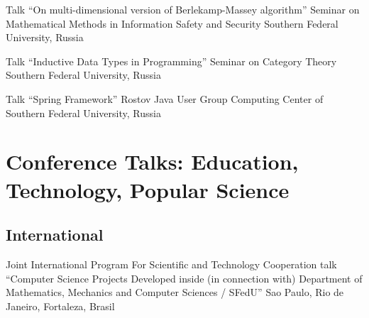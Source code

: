 \documentclass[11pt,a4paper]{moderncv}   %
\newcommand{\MyHrefImpl}[2]{%
\textcolor{blue}{\href{#1}{#2}}}
\def\LINKS{}
\newcommand*{\myhref}[2]{%
\ignorespaces%
\ifdefined\LINKS%
\MyHrefImpl{#1}{#2}%
\else%
#2%
\fi%
}
\begin{document}
{%
    {Talk “On multi-dimensional version of Berlekamp-Massey algorithm”}%
    {Seminar on Mathematical Methods in Information Safety and Security}%
    {Southern Federal University, Russia}%
    {}%
    {%
    }

%
    {Talk “Inductive Data Types in Programming”}%
    {Seminar on Category Theory}%
    {Southern Federal University, Russia}%
    {}%
    {%
    }


%
    {Talk “Spring Framework”}%
    {Rostov Java User Group}%
    {Computing Center of Southern Federal University, Russia}%
    {}%
    {%
    }
}

\section{Conference Talks: Education, Technology, Popular Science}

\subsection{International}

%
    {Joint International Program For Scientific and Technology Cooperation}%
    {talk “Computer Science Projects Developed inside (in connection with) Department of Mathematics, Mechanics and Computer Sciences / SFedU”}
    {Sao Paulo, Rio de Janeiro, Fortaleza, Brasil}{}%
    {%
    }
\end{document}
